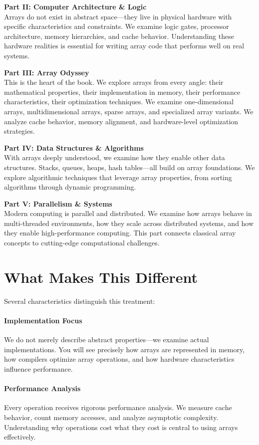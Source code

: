 \textbf{Part II: Computer Architecture \& Logic}\\
Arrays do not exist in abstract space—they live in physical hardware with specific characteristics and constraints. We examine logic gates, processor architecture, memory hierarchies, and cache behavior. Understanding these hardware realities is essential for writing array code that performs well on real systems.

\textbf{Part III: Array Odyssey}\\
This is the heart of the book. We explore arrays from every angle: their mathematical properties, their implementation in memory, their performance characteristics, their optimization techniques. We examine one-dimensional arrays, multidimensional arrays, sparse arrays, and specialized array variants. We analyze cache behavior, memory alignment, and hardware-level optimization strategies.

\textbf{Part IV: Data Structures \& Algorithms}\\
With arrays deeply understood, we examine how they enable other data structures. Stacks, queues, heaps, hash tables—all build on array foundations. We explore algorithmic techniques that leverage array properties, from sorting algorithms through dynamic programming.

\textbf{Part V: Parallelism \& Systems}\\
Modern computing is parallel and distributed. We examine how arrays behave in multi-threaded environments, how they scale across distributed systems, and how they enable high-performance computing. This part connects classical array concepts to cutting-edge computational challenges.

\section*{What Makes This Different}

Several characteristics distinguish this treatment:

\paragraph{Implementation Focus}
We do not merely describe abstract properties—we examine actual implementations. You will see precisely how arrays are represented in memory, how compilers optimize array operations, and how hardware characteristics influence performance.

\paragraph{Performance Analysis}
Every operation receives rigorous performance analysis. We measure cache behavior, count memory accesses, and analyze asymptotic complexity. Understanding why operations cost what they cost is central to using arrays effectively.

